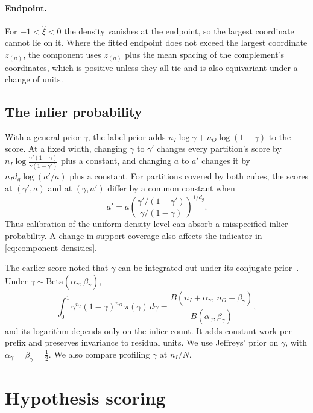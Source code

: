 \documentclass[10pt,twocolumn,letterpaper]{article}
\begin{document}
\paragraph{Endpoint.}
For $-1<\hat\xi<0$ the density vanishes at the endpoint, so the largest
coordinate cannot lie on it. Where the fitted endpoint does not exceed
the largest coordinate $z_{(n)}$, the component uses $z_{(n)}$ plus the
mean spacing of the complement's coordinates, which is positive unless
they all tie and is also equivariant under a change of units.

\subsection{The inlier probability}
\label{sec:label-prior}

With a general prior $\gamma$, the label prior adds
$n_I\log\gamma+n_O\log(1-\gamma)$ to the score. At a fixed width,
changing $\gamma$ to $\gamma'$ changes every partition's score by
$n_I\log\frac{\gamma'(1-\gamma)}{\gamma(1-\gamma')}$ plus a constant,
and changing $a$ to $a'$ changes it by $n_I d_g\log(a'/a)$ plus a
constant. For partitions covered by both cubes, the scores at
$(\gamma',a)$ and at $(\gamma,a')$ differ by a common constant when
\begin{equation}
 a'=a\left(\frac{\gamma'/(1-\gamma')}{\gamma/(1-\gamma)}\right)^{1/d_g}.
 \label{eq:gamma-width}
\end{equation}
Thus calibration of the uniform density level can absorb a misspecified
inlier probability. A change in support coverage also affects the
indicator in \cref{eq:component-densities}.

The earlier score noted that $\gamma$ can be integrated out under its
conjugate prior~\cite{Pritts2026}. Under $\gamma\sim\mathrm{Beta}(\alpha_\gamma,\beta_\gamma)$,
\begin{equation}
 \int_0^1\gamma^{n_I}(1-\gamma)^{n_O}\,\pi(\gamma)\,d\gamma
 =\frac{B(n_I+\alpha_\gamma,\,n_O+\beta_\gamma)}{B(\alpha_\gamma,\beta_\gamma)},
 \label{eq:label-marginal}
\end{equation}
and its logarithm depends only on the inlier count. It adds constant
work per prefix and preserves invariance to residual units. We use
Jeffreys' prior on $\gamma$, with $\alpha_\gamma=\beta_\gamma=\tfrac12$.
We also compare profiling $\gamma$ at $n_I/N$.

\section{Hypothesis scoring}
\label{sec:inference}
\end{document}
